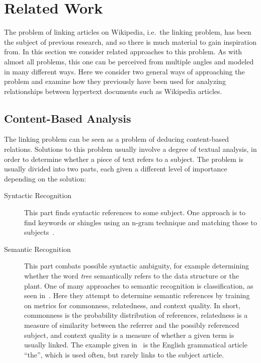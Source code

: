 \section{Related Work}\label{sec:related_work}
The problem of linking articles on Wikipedia, i.e.\ the linking problem, has been the subject of previous research, and so there is much material to gain inspiration from. In this section we consider related approaches to this problem. As with almost all problems, this one can be perceived from multiple angles and modeled in many different ways. Here we consider two general ways of approaching the problem and examine how they previously have been used for analyzing relationships between hypertext documents such as Wikipedia articles.

\subsection{Content-Based Analysis}\label{related_semantic_contextual}
The linking problem can be seen as a problem of deducing content-based relations. Solutions to this problem usually involve a degree of textual analysis, in order to determine whether a piece of text refers to a subject. The problem is usually divided into two parts, each given a different level of importance depending on the solution:

\begin{description}
  \item[Syntactic Recognition] This part finds syntactic references to some subject. One approach is to find keywords or shingles using an n-gram technique and matching those to subjects~\cite{mihalcea2007wikify}.

  \item[Semantic Recognition] This part combats possible syntactic ambiguity, for example determining whether the word \emph{tree} semantically refers to the data structure or the plant. One of many approaches to semantic recognition is classification, as seen in~\cite{milne2008learning}. Here they attempt to determine semantic references by training on metrics for commonness, relatedness, and context quality. In short, commonness is the probability distribution of references, relatedness is a measure of similarity between the referrer and the possibly referenced subject, and context quality is a measure of whether a given term is usually linked. The example given in~\cite{milne2008learning} is the English grammatical article \enquote{the}, which is used often, but rarely links to the subject article.
\end{description}

